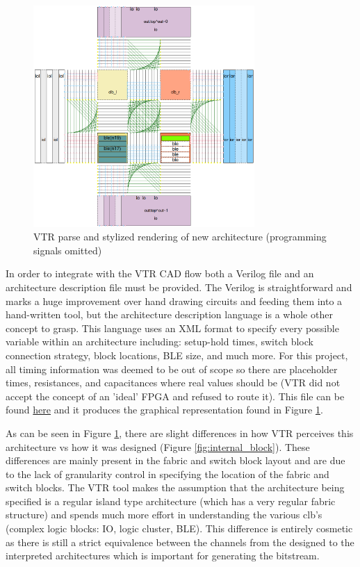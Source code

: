 \documentclass[12pt]{article}
\begin{document}
\begin{figure}[H]
    \centering
    \includegraphics[width=0.75\textwidth]{vtr_arch}
    \caption{VTR parse and stylized rendering of new architecture (programming signals omitted)}
    \label{fig:vtr_arch}
\end{figure}

In order to integrate with the VTR CAD flow both a Verilog file and an architecture
description file must be
provided. The Verilog is straightforward and marks a huge improvement over hand drawing circuits
and feeding them into a hand-written tool, but the architecture description language
is a whole other concept to grasp. This language uses an XML format to specify every
possible variable within an architecture including: setup-hold times, switch block
connection strategy, block locations, BLE size, and much more. For this project, all
timing information was deemed to be out of scope so there are placeholder times, resistances,
and capacitances where real values should be (VTR did not accept the concept of
an 'ideal' FPGA and refused to route it). This file can be found
\href{https://github.com/JosephPrachar/fpga/blob/master/vtr/basic.xml}{here}
and it produces the graphical representation found in Figure \ref{fig:vtr_arch}.

As can be seen in Figure \ref{fig:vtr_arch}, there are slight differences in how VTR
perceives this architecture vs how it was designed (Figure \ref{fig:internal_block}).
These differences are mainly present in the fabric and switch block layout and are
due to the lack of granularity control in specifying the location of the fabric and switch blocks.
The VTR tool makes the assumption that the architecture being specified is a regular
island type architecture (which has a very regular fabric structure) and spends much
more effort in understanding the various clb's (complex logic blocks: IO, logic cluster, BLE).
This difference is entirely cosmetic as there is still a strict equivalence between
the channels from the designed to the interpreted architectures which is important for
generating the bitstream.
\end{document}
